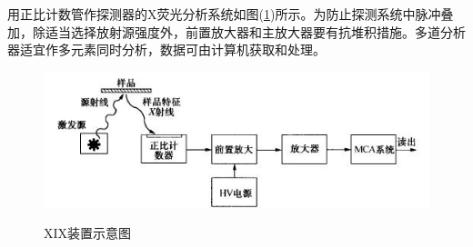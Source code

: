 \documentclass[a4paper]{article}
\begin{document}
用正比计数管作探测器的X荧光分析系统如图(\ref{XIXdevice})所示。为防止探测系统中脉冲叠加，除适当选择放射源强度外，前置放大器和主放大器要有抗堆积措施。多道分析器适宜作多元素同时分析，数据可由计算机获取和处理。
\begin{figure}[H]
\centering
\includegraphics[width=12cm]{fig/6.jpg}\\
\caption{XIX装置示意图}\label{XIXdevice}
\end{figure}
\end{document}
